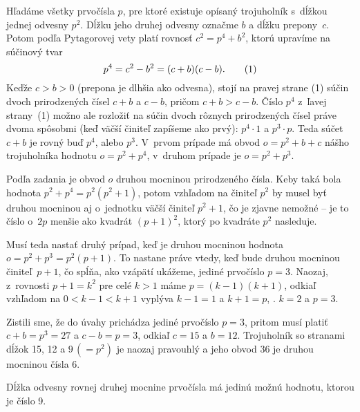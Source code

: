 {%
Hľadáme všetky prvočísla $p$, pre ktoré existuje opísaný trojuholník
s~dĺžkou jednej odvesny $p^2$. Dĺžku jeho
druhej odvesny označme $b$ a dĺžku prepony~$c$. Potom podľa
Pytagorovej vety platí rovnosť $c^2=p^4+b^2$, ktorú upravíme na
súčinový tvar
$$
p^4=c^2-b^2=(c+b)(c-b).
\tag1
$$
Keďže $c>b>0$ (prepona je dlhšia ako
odvesna), stojí na pravej strane (1) súčin dvoch
prirodzených čísel $c+b$ a $c-b$, pričom $c+b>c-b$.
Číslo $p^4$ z~ľavej strany~(1) možno ale rozložiť na súčin
dvoch rôznych prirodzených čísel práve dvoma spôsobmi (keď väčší činiteľ
zapíšeme ako prvý): $p^4\cdot 1$ a $p^3\cdot p$. Teda súčet
$c+b$ je rovný buď $p^4$, alebo $p^3$. V~prvom prípade má obvod
$o=p^2+b+c$ nášho trojuholníka hodnotu $o=p^2+p^4$, v~druhom prípade
je $o=p^2+p^3$.

Podľa zadania je obvod $o$ druhou mocninou prirodzeného čísla.
Keby taká bola hodnota $p^2+p^4=p^2(p^2+1)$, potom vzhľadom
na činiteľ $p^2$ by musel byť druhou mocninou aj o~jednotku väčší
činiteľ $p^2+1$, čo je zjavne nemožné -- je to číslo o~$2p$
menšie ako kvadrát $(p+1)^2$, ktorý po kvadráte $p^2$
nasleduje.

Musí teda nastať druhý prípad, keď je druhou mocninou hodnota
$o=p^2+p^3=p^2(p+1)$. To nastane práve vtedy, keď
bude druhou mocninou činiteľ~$p+1$, čo spĺňa,
ako vzápätí ukážeme, jediné prvočíslo $p=3$.
Naozaj, z~rovnosti $p+1=k^2$ pre celé
$k>1$ máme $p=(k-1)(k+1)$, odkiaľ vzhľadom na $0<k-1<k+1$ vyplýva
$k-1=1$ a $k+1=p$, \tj. $k=2$ a $p=3$.

Zistili sme, že do úvahy prichádza jediné prvočíslo $p=3$, pritom
musí platiť ${c+b}=p^3=27$ a $c-b=p=3$, odkiaľ $c=15$ a $b=12$.
Trojuholník so stranami dĺžok 15, 12 a $9\,(=\!p^2)$ je naozaj pravouhlý
a jeho obvod 36 je druhou mocninou čísla 6.

\zaver
Dĺžka odvesny rovnej druhej mocnine prvočísla má
jedinú možnú hodnotu, ktorou je číslo 9.

}
